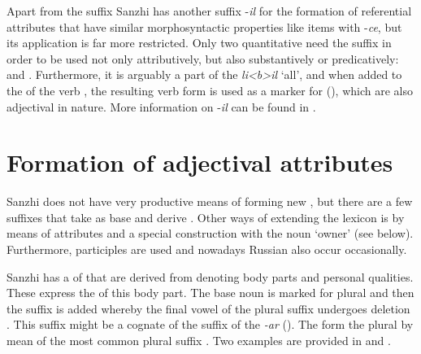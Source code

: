 Apart from the suffix  Sanzhi has another suffix -\textit{il} for the formation of referential attributes that have similar morphosyntactic properties like items with -\textit{ce}, but its application is far more restricted. Only two quantitative  need the suffix  in order to be used not only attributively, but also substantively or predicatively:   and  . Furthermore, it is arguably a part of the  \textit{li<b>il} `all', and when added to the  of the verb  , the resulting verb form is used as a marker for  (), which are also adjectival in nature. More information on -\textit{il} can be found in .




\section{Formation of adjectival attributes}
\label{sec:Derivation of adjectives}
Sanzhi does not have very productive means of forming new , but there are a few suffixes that take  as base and derive . Other ways of extending the lexicon is by means of  attributes and a special construction with the noun `owner' (see below). Furthermore, participles are used and nowadays Russian  also occur occasionally.  

Sanzhi has a  of  that are derived from  denoting body parts and personal qualities. These  express the  of this body part. The base noun is marked for plural and then the suffix  is added whereby the final vowel of the plural suffix undergoes deletion . This suffix might be a cognate of the  suffix of the  \textit{-ar} (). The  form the plural by mean of the most common plural suffix . Two examples are provided in  and .


